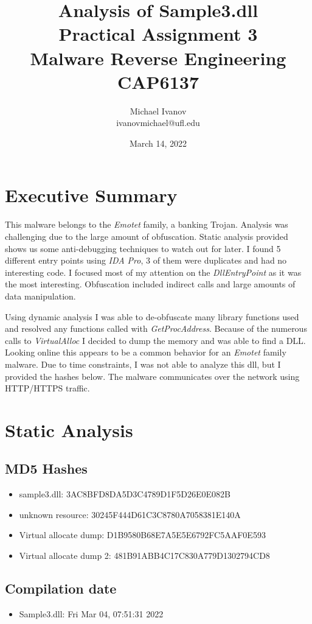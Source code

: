 \documentclass{article}
\title{Analysis of Sample3.dll \\Practical Assignment 3\\Malware Reverse Engineering \\
CAP6137}
\author{Michael Ivanov \\
ivanovmichael@ufl.edu}
\date{March 14, 2022}
\begin{document}
    \maketitle
    \pagebreak
    \section{Executive Summary}
    This malware belongs to the \textit{Emotet} family, a banking Trojan\cite{emotet}. Analysis was challenging due to the large amount of obfuscation. Static analysis provided shows us some anti-debugging techniques to watch out for later. I found 5 different entry points using \textit{IDA Pro}, 3 of them were duplicates and had no interesting code. I focused most of my attention on the \textit{DllEntryPoint} as it was the most interesting. Obfuscation included indirect calls and large amounts of data manipulation.

    Using dynamic analysis I was able to de-obfuscate many library functions used and resolved any functions called with \textit{GetProcAddress}. Because of the numerous calls to \textit{VirtualAlloc} I decided to dump the memory and was able to find a DLL. Looking online this appears to be a common behavior for an \textit{Emotet} family malware. Due to time constraints, I was not able to analyze this dll, but I provided the hashes below. The malware communicates over the network using HTTP/HTTPS traffic.
    \pagebreak
    \section{Static Analysis}
    \subsection{MD5 Hashes}
    \begin{itemize}
        \item sample3.dll: 3AC8BFD8DA5D3C4789D1F5D26E0E082B
        \item unknown resource: 30245F444D61C3C8780A7058381E140A
        \item Virtual allocate dump: D1B9580B68E7A5E5E6792FC5AAF0E593
        \item Virtual allocate dump 2: 481B91ABB4C17C830A779D1302794CD8
    \end{itemize}
    \subsection{Compilation date}
    \begin{itemize}
        \item Sample3.dll: Fri Mar 04, 07:51:31 2022
    \end{itemize}
\end{document}
